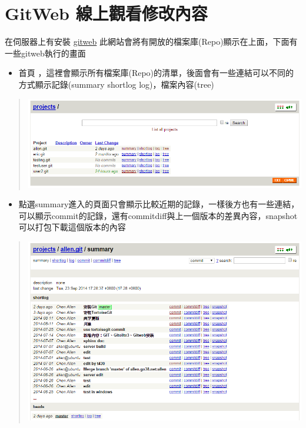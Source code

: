 \documentclass[letterpaper,10pt,english]{sphinxmanual}
\begin{document}
\section{GitWeb 線上觀看修改內容}
\label{_doc/writing/index:id7}
在伺服器上有安裝 \href{http://allen.go38.net/cgi-bin/gitweb.cgi}{gitweb} 此網站會將有開放的檔案庫(Repo)顯示在上面，下面有一些gitweb執行的畫面
\begin{itemize}
\item {} 
首頁 ，這裡會顯示所有檔案庫(Repo)的清單，後面會有一些連結可以不同的方式顯示記錄(summary \textbar{} shortlog \textbar{} log)，檔案內容(tree)

\end{itemize}
\begin{quote}

\includegraphics{gitweb-001.png}
\end{quote}
\begin{itemize}
\item {} 
點選summary進入的頁面只會顯示比較近期的記錄，一樣後方也有一些連結，可以顯示commit的記錄，還有commitdiff與上一個版本的差異內容，snapshot可以打包下載這個版本的內容

\end{itemize}
\begin{quote}

\includegraphics{gitweb-002.png}
\end{quote}
\end{document}
